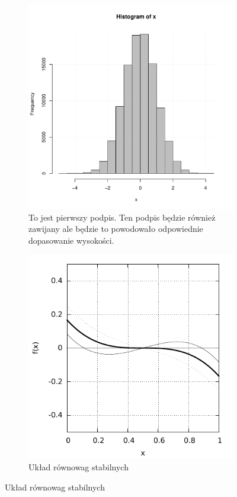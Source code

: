 \documentclass[polish, twoside, 12pt, a4paper]{article}
\theoremstyle{definition}
\theoremstyle{plain}
\theoremstyle{remark}
\begin{document}
\begin{figure}[hbt]
  \centering
  \begin{subfigure}[t]{0.45\textwidth}
    \includegraphics[width=\textwidth]{./figure-1}
    \caption{To jest pierwszy podpis. Ten podpis będzie również zawijany ale będzie to powodowało odpowiednie dopasowanie wysokości.}
    \label{fig:xxxa}
  \end{subfigure}
  \hfill
  \begin{subfigure}[t]{0.45\textwidth}
    \includegraphics[width=\textwidth]{figure-2}
    \caption{Układ równowag stabilnych}
    \label{fig:xxxb}
  \end{subfigure}


\end{figure}
\end{document}
